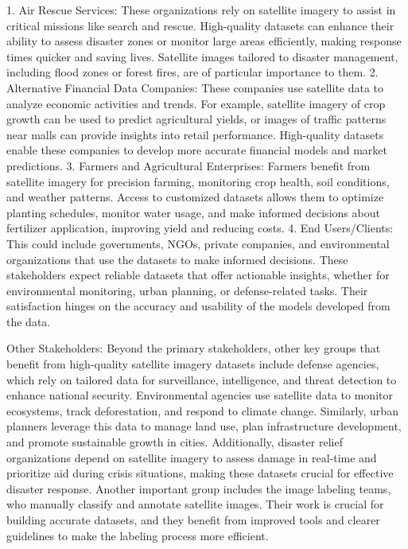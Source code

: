 \documentclass{article}
\begin{document}
1.	Air Rescue Services: These organizations rely on satellite imagery to assist in critical missions like search and rescue. High-quality datasets can enhance their ability to assess disaster zones or monitor large areas efficiently, making response times quicker and saving lives. Satellite images tailored to disaster management, including flood zones or forest fires, are of particular importance to them.
2.	Alternative Financial Data Companies: These companies use satellite data to analyze economic activities and trends. For example, satellite imagery of crop growth can be used to predict agricultural yields, or images of traffic patterns near malls can provide insights into retail performance. High-quality datasets enable these companies to develop more accurate financial models and market predictions.
3.	Farmers and Agricultural Enterprises: Farmers benefit from satellite imagery for precision farming, monitoring crop health, soil conditions, and weather patterns. Access to customized datasets allows them to optimize planting schedules, monitor water usage, and make informed decisions about fertilizer application, improving yield and reducing costs.
4.	End Users/Clients: This could include governments, NGOs, private companies, and environmental organizations that use the datasets to make informed decisions. These stakeholders expect reliable datasets that offer actionable insights, whether for environmental monitoring, urban planning, or defense-related tasks. Their satisfaction hinges on the accuracy and usability of the models developed from the data.

Other Stakeholders: Beyond the primary stakeholders, other key groups that benefit from high-quality satellite imagery datasets include defense agencies, which rely on tailored data for surveillance, intelligence, and threat detection to enhance national security. Environmental agencies use satellite data to monitor ecosystems, track deforestation, and respond to climate change. Similarly, urban planners leverage this data to manage land use, plan infrastructure development, and promote sustainable growth in cities. Additionally, disaster relief organizations depend on satellite imagery to assess damage in real-time and prioritize aid during crisis situations, making these datasets crucial for effective disaster response. Another important group includes the image labeling teams, who manually classify and annotate satellite images. Their work is crucial for building accurate datasets, and they benefit from improved tools and clearer guidelines to make the labeling process more efficient.
\end{document}
